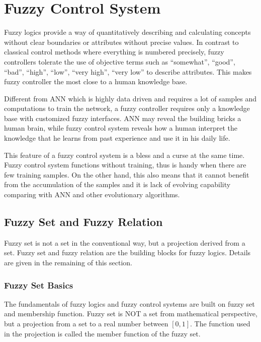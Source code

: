 \chapter{Fuzzy Control System} \label{ch:fcs}

Fuzzy logics provide a way of quantitatively describing and calculating concepts without clear boundaries or attributes without precise values. In contrast to classical control methods where everything is numbered precisely, fuzzy controllers tolerate the use of objective terms such as ``somewhat'', ``good'', ``bad'', ``high'', ``low'', ``very high'', ``very low'' to describe attributes. This makes fuzzy controller the most close to a human knowledge base.

Different from ANN which is highly data driven and requires a lot of samples and computations to train the network, a fuzzy controller requires only a knowledge base with customized fuzzy interfaces. ANN may reveal the building bricks a human brain, while fuzzy control system reveals how a human interpret the knowledge that he learns from past experience and use it in his daily life.

This feature of a fuzzy control system is a bless and a curse at the same time. Fuzzy control system functions without training, thus is handy when there are few training samples. On the other hand, this also means that it cannot benefit from the accumulation of the samples and it is lack of evolving capability comparing with ANN and other evolutionary algorithms.

\section{Fuzzy Set and Fuzzy Relation}

Fuzzy set is not a set in the conventional way, but a projection derived from a set. Fuzzy set and fuzzy relation are the building blocks for fuzzy logics. Details are given in the remaining of this section.

\subsection{Fuzzy Set Basics}

The fundamentals of fuzzy logics and fuzzy control systems are built on fuzzy set and membership function. Fuzzy set is NOT a set from mathematical perspective, but a projection from a set to a real number between $[0, 1]$. The function used in the projection is called the member function of the fuzzy set.

